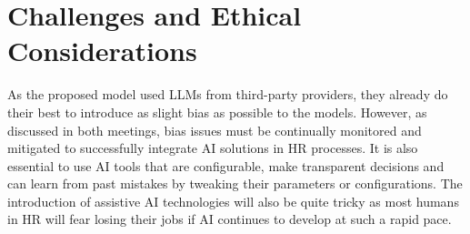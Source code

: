 \documentclass[draft,final]{thesisclass} %
\begin{document}
\section{Challenges and Ethical Considerations}
As the proposed model used \gls{LLM}s from third-party providers, they already do their best to introduce as slight bias as possible to the models. However, as discussed in both meetings, bias issues must be continually monitored and mitigated to successfully integrate \acs{AI} solutions in \acs{HR} processes. It is also essential to use \acs{AI} tools that are configurable, make transparent decisions and can learn from past mistakes by tweaking their parameters or configurations. The introduction of assistive \acs{AI} technologies will also be quite tricky as most humans in \acs{HR} will fear losing their jobs if \acs{AI} continues to develop at such a rapid pace.
\end{document}
